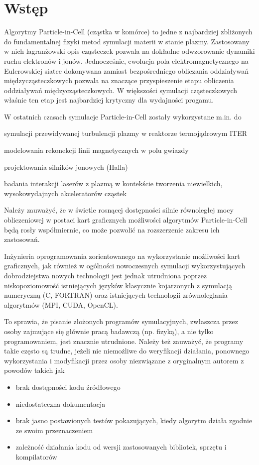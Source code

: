 \newcommand{\code}[1]{\texttt{#1}}

\section[Wstęp]{Wstęp} %
Algorytmy Particle-in-Cell (cząstka w komórce) to jedne z najbardziej zbliżonych do fundamentalnej fizyki
metod symulacji materii w stanie plazmy. Zastosowany w nich lagranżowski opis cząsteczek pozwala na dokładne
odwzorowanie dynamiki ruchu elektronów i jonów. Jednocześnie, ewolucja pola elektromagnetycznego na Eulerowskiej
siatce dokonywana zamiast bezpośredniego obliczania oddziaływań międzycząsteczkowych pozwala na znaczące
przyspieszenie etapu obliczenia oddziaływań międzycząsteczkowych. W większości symulacji cząsteczkowych właśnie
ten etap jest najbardziej krytyczny dla wydajności progamu.

W ostatnich czasach symulacje Particle-in-Cell zostały wykorzystane m.in. do
\item symulacji przewidywanej turbulencji plazmy w reaktorze termojądrowym ITER %
\item modelowania rekonekcji linii magnetycznych w polu gwiazdy %
\item projektowania silników jonowych (Halla) %
\item badania interakcji laserów z plazmą w kontekście tworzenia niewielkich,
    wysokowydajnych akceleratorów cząstek %

    Należy zauważyć, że w świetle rosnącej dostępności silnie równoległej mocy obliczeniowej w postaci kart graficznych
    możliwości algorytmów Particle-in-Cell będą rosły współmiernie, co może pozwolić na rozszerzenie zakresu ich zastosowań.

    Inżynieria oprogramowania zorientowanego na wykorzystanie możliwości kart graficznych,
    jak również w ogólności nowoczesnych symulacji wykorzystujących dobrodziejstwa nowych technologii
    jest jednak utrudniona poprzez niskopoziomowość istniejących języków klasycznie
    kojarzonych z symulacją numeryczną (C, FORTRAN) oraz istniejących technologii zrównoleglania
    algorytmów (MPI, CUDA, OpenCL).

    To sprawia, że pisanie złożonych programów symulacyjnych, zwłaszcza przez osoby
    zajmujące się głównie pracą badawczą (np. fizyką), a nie tylko programowaniem,
    jest znacznie utrudnione. Należy też zauważyć, że programy takie często są
    trudne, jeżeli nie niemożliwe do weryfikacji działania, ponownego wykorzystania
    i modyfikacji przez osoby niezwiązane z oryginalnym autorem z powodów takich jak
    \begin{itemize}
        \item brak dostępności kodu źródłowego
        \item niedostateczna dokumentacja
        \item brak jasno postawionych testów pokazujących, kiedy algorytm działa zgodnie ze swoim przeznaczeniem
        \item zależność działania kodu od wersji zastosowanych bibliotek, sprzętu i kompilatorów
    \end{itemize}

